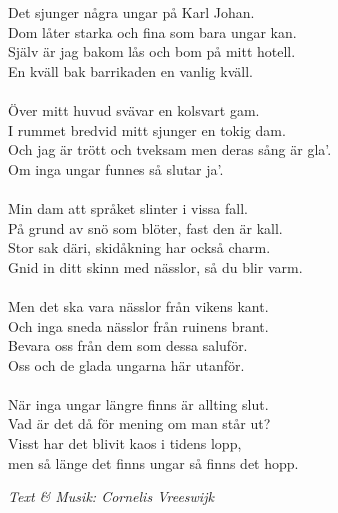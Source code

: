 \vspace{10pt}
Det sjunger några ungar på Karl Johan.\\
Dom låter starka och fina som bara ungar kan.\\
Själv är jag bakom lås och bom på mitt hotell.\\
En kväll bak barrikaden en vanlig kväll.\\
\\
Över mitt huvud svävar en kolsvart gam.\\
I rummet bredvid mitt sjunger en tokig dam.\\
Och jag är trött och tveksam men deras sång är gla'.\\
Om inga ungar funnes så slutar ja'.\\
\\
Min dam att språket slinter i vissa fall.\\
På grund av snö som blöter, fast den är kall.\\
Stor sak däri, skidåkning har också charm.\\
Gnid in ditt skinn med nässlor, så du blir varm.\\
\\
Men det ska vara nässlor från vikens kant.\\
Och inga sneda nässlor från ruinens brant.\\
Bevara oss från dem som dessa saluför.\\
Oss och de glada ungarna här utanför.\\
\\
När inga ungar längre finns är allting slut.\\
Vad är det då för mening om man står ut?\\
Visst har det blivit kaos i tidens lopp,\\
men så länge det finns ungar så finns det hopp.\par
\vspace{10pt}
{\footnotesize\textit{Text \& Musik: Cornelis Vreeswijk}}
